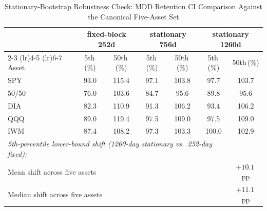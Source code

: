 \begin{table}[H]
\centering
\begin{threeparttable}
\caption{Stationary-Bootstrap Robustness Check: MDD Retention CI Comparison Against the Canonical Five-Asset Set}
\label{tab:k1417_stationary_compare}
\begin{tabular}{lcccccc}
\toprule
& \multicolumn{2}{c}{fixed-block 252d} & \multicolumn{2}{c}{stationary 756d} & \multicolumn{2}{c}{stationary 1260d} \\
\cmidrule(lr){2-3} \cmidrule(lr){4-5} \cmidrule(lr){6-7}
Asset & 5th\,(\%) & 50th\,(\%) & 5th\,(\%) & 50th\,(\%) & 5th\,(\%) & 50th\,(\%) \\
\midrule
SPY & 93.0 & 115.4 & 97.1 & 103.8 & 97.7 & 103.7 \\
50/50 & 76.0 & 103.6 & 84.7 & 95.6 & 89.8 & 95.6 \\
DIA & 82.3 & 110.9 & 91.3 & 106.2 & 93.4 & 106.2 \\
QQQ & 89.0 & 119.4 & 97.5 & 109.0 & 97.5 & 109.0 \\
IWM & 87.4 & 108.2 & 97.3 & 103.3 & 100.0 & 102.9 \\
\midrule
\multicolumn{6}{l}{\textit{5th-percentile lower-bound shift (1260-day stationary vs.\ 252-day fixed):}} & \\
\multicolumn{6}{l}{\quad Mean shift across five assets} & $+10.1$\,pp \\ %
\multicolumn{6}{l}{\quad Median shift across five assets} & $+11.1$\,pp \\
\bottomrule
\end{tabular}
\begin{tablenotes}
\small

\end{tablenotes}
\end{threeparttable}
\end{table}
